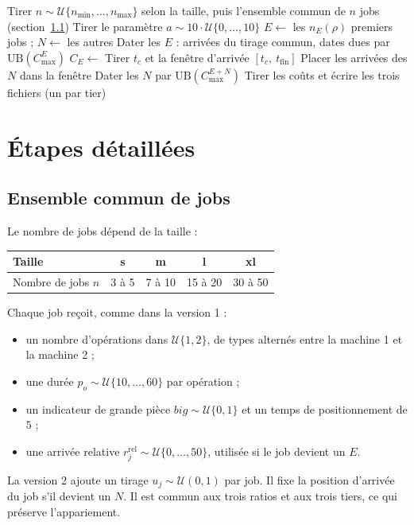 \documentclass[11pt,a4paper]{article}
\newcommand{\UB}{\mathrm{UB}}
\newcommand{\CE}{C_E}
\begin{document}
\begin{algorithm}[ht]
\caption{Génération d'une instance structurelle $i$}
\label{alg:global}
\begin{algorithmic}[1]
\State Tirer $n \sim \mathcal{U}\{n_{\min},\dots,n_{\max}\}$ selon la taille, puis l'ensemble commun de $n$ jobs (section~\ref{sec:pool})
\State Tirer le paramètre $a \sim 10\cdot\mathcal{U}\{0,\dots,10\}$
  \State $E \gets$ les $n_E(\rho)$ premiers jobs ; $N \gets$ les autres 
  \State Dater les $E$ : arrivées du tirage commun, dates dues par $\UB(C^E_{\max})$ 
  \State $\CE \gets$  
    \State Tirer $t_c$ et la fenêtre d'arrivée $[t_c,\ t_{\mathrm{fin}}]$ 
    \State Placer les arrivées des $N$ dans la fenêtre 
    \State Dater les $N$ par $\UB(C^{E+N}_{\max})$ 
  \EndFor
    \State Tirer les coûts et écrire les trois fichiers (un par tier) 
  \EndFor
\EndFor
\end{algorithmic}
\end{algorithm}

\section{Étapes détaillées}

\subsection{Ensemble commun de jobs}
\label{sec:pool}

Le nombre de jobs dépend de la taille :
\begin{center}
\begin{tabular}{lcccc}
\toprule
Taille & s & m & l & xl \\
\midrule
Nombre de jobs $n$ & 3 à 5 & 7 à 10 & 15 à 20 & 30 à 50 \\
\bottomrule
\end{tabular}
\end{center}
Chaque job reçoit, comme dans la version 1 :
\begin{itemize}
  \item un nombre d'opérations dans $\mathcal{U}\{1, 2\}$, de types alternés entre la machine 1 et la machine 2 ;
  \item une durée $p_o \sim \mathcal{U}\{10,\dots,60\}$ par opération ;
  \item un indicateur de grande pièce $\mathit{big} \sim \mathcal{U}\{0,1\}$ et un temps de positionnement de $5$ ;
  \item une arrivée relative $r^{\mathrm{rel}}_j \sim \mathcal{U}\{0,\dots,50\}$, utilisée si le job devient un $E$.
\end{itemize}
La version 2 ajoute un tirage $u_j \sim \mathcal{U}(0,1)$ par job.
Il fixe la position d'arrivée du job s'il devient un $N$.
Il est commun aux trois ratios et aux trois tiers, ce qui préserve l'appariement.
\end{document}
